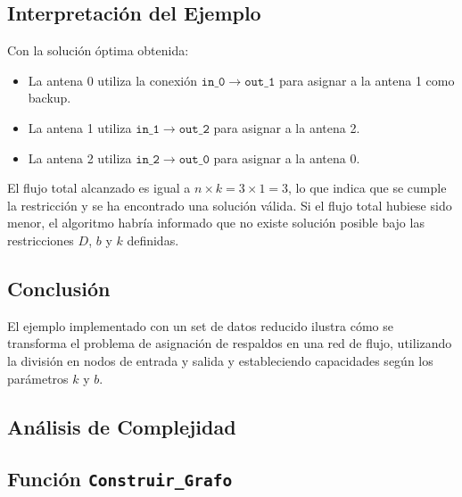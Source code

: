 \documentclass[a4paper, 12pt]{article}
\begin{document}
\subsection{Interpretación del Ejemplo}

Con la solución óptima obtenida:
\begin{itemize}
  \item La antena 0 utiliza la conexión \( \mathtt{in\_0} \to \mathtt{out\_1} \) para asignar a la antena 1 como backup.
  \item La antena 1 utiliza \( \mathtt{in\_1} \to \mathtt{out\_2} \) para asignar a la antena 2.
  \item La antena 2 utiliza \( \mathtt{in\_2} \to \mathtt{out\_0} \) para asignar a la antena 0.
\end{itemize}

El flujo total alcanzado es igual a \( n \times k = 3 \times 1 = 3 \), lo que indica que se cumple la restricción y se ha encontrado una solución válida. Si el flujo total hubiese sido menor, el algoritmo habría informado que no existe solución posible bajo las restricciones \( D \), \( b \) y \( k \) definidas.

\subsection{Conclusión}

El ejemplo implementado con un set de datos reducido ilustra cómo se transforma el problema de asignación de respaldos en una red de flujo, utilizando la división en nodos de entrada y salida y estableciendo capacidades según los parámetros \(k\) y \(b\). 

\subsection{Análisis de Complejidad}


\subsection*{Función \texttt{Construir\_Grafo}}
\end{document}
